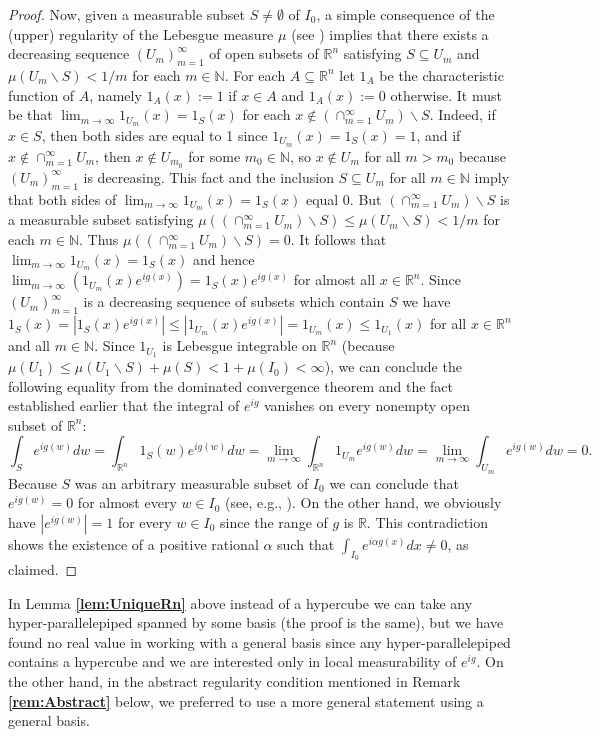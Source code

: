 \documentclass[12 pt]{amsart}
\theoremstyle{definition}
\newcommand{\R}{\mathbb{R}}
\newcommand{\N}{\mathbb{N}}
\newcommand{\bref}[1]{\textbf{\ref{#1}}} %
\begin{document}
\begin{proof}
Now, given a measurable subset $S\neq\emptyset$ of $I_0$, a simple consequence of the (upper) regularity of the Lebesgue  measure $\mu$ (see \cite[Property M9, p. 50]{Jones2001book}) implies  that there exists a decreasing sequence  $(U_m)_{m=1}^{\infty}$ of open subsets of $\R^n$   satisfying $S\subseteq U_m$ and  $\mu(U_m\backslash S)<1/m$ for each $m\in\N$. For each $A\subseteq \R^n$ let $1_A$ be the characteristic function of $A$, namely $1_A(x):=1$ if $x\in A$ and $1_A(x):=0$ otherwise. It must be that 
 $\lim_{m\to \infty}1_{U_m}(x)=1_S(x)$ for each $x\notin (\cap_{m=1}^{\infty}U_m)\backslash S$. Indeed, if $x\in S$, then both sides are equal to 1 since $1_{U_m}(x)=1_S(x)=1$, and if $x\notin \cap_{m=1}^{\infty}U_m$, then $x\notin U_{m_0}$ for some $m_0\in\N$, so $x\notin U_m$ for all $m>m_0$ because $(U_m)_{m=1}^{\infty}$ is decreasing. This fact and the inclusion $S\subseteq U_m$ for all $m\in\N$ imply that both sides of  $\lim_{m\to \infty}1_{U_m}(x)=1_S(x)$ equal 0. But $(\cap_{m=1}^{\infty}U_m)\backslash S$ is a measurable subset satisfying  $\mu((\cap_{m=1}^{\infty}U_m)\backslash S)\leq \mu(U_m\backslash S)<1/m$ for each $m\in\N$. Thus $\mu((\cap_{m=1}^{\infty}U_m)\backslash S)=0$. It follows that  $\lim_{m\to \infty}1_{U_m}(x)=1_S(x)$ and hence $\lim_{m\to \infty}(1_{U_m}(x)e^{ig(x)})=1_S(x)e^{ig(x)}$ for almost all $x\in \R^n$. Since $(U_m)_{m=1}^{\infty}$ is a decreasing sequence of subsets which contain $S$ we have $1_S(x)=|1_S(x)e^{ig(x)}|\leq |1_{U_m}(x)e^{ig(x)}|=1_{U_m}(x)\leq 1_{U_1}(x)$ for all $x\in \R^n$ and all $m\in\N$. Since $1_{U_1}$ is Lebesgue integrable on $\R^n$ (because $\mu(U_1)\leq \mu(U_1\backslash S)+\mu(S)<1+\mu(I_0)<\infty$), we can conclude the following equality from the dominated convergence theorem and the fact established earlier that the integral of $e^{ig}$ vanishes on every nonempty open subset of $\R^n$:
\begin{equation*}
\int_{S}e^{ig(w)}dw=\int_{\R^n} 1_S(w)e^{ig(w)}dw=\lim_{m\to\infty}\int_{\R^n}1_{U_m}e^{ig(w)}dw=\lim_{m\to\infty}\int_{U_m}e^{ig(w)}dw=0. 
\end{equation*}
Because $S$ was an arbitrary measurable subset of $I_0$ we can conclude that $e^{ig(w)}=0$ for  almost every $w\in I_0$ (see, e.g., \cite[p. 105]{KurtzSwartz2004}). On the other hand, we obviously have $|e^{ig(w)}|=1$  for every $w\in I_0$ since the range of $g$ is $\R$. This contradiction shows the existence of a positive rational $\alpha$ such that $\int_{I_0} e^{i\alpha g(x)}dx\neq 0$, as claimed.  
\end{proof}
In Lemma \bref{lem:UniqueRn} above instead of a hypercube we can take any hyper-parallelepiped spanned by some basis (the proof is the same), but we have found no real value in working with  a general basis  since any hyper-parallelepiped contains a hypercube and we are interested only in local measurability of $e^{ig}$. On the other hand, in the abstract regularity condition mentioned in Remark \bref{rem:Abstract} below, we preferred to use a more general statement using a general basis. 
\end{document}
